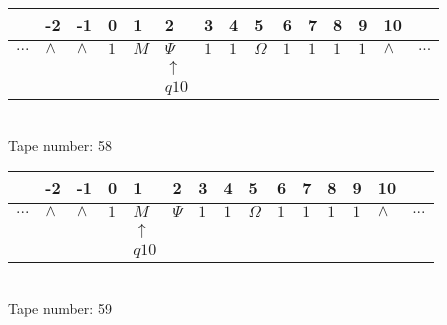 \documentclass{article}
\begin{document}
\begin{table}[H]
\centering
\begin{tabular}{lllllllllllllll}
 & -2 & -1 & 0 & 1 & 2 & 3 & 4 & 5 & 6 & 7 & 8 & 9 & 10 & \\
\hline
$...$ & \multicolumn{1}{|l|}{$\wedge$} & \multicolumn{1}{|l|}{$\wedge$} & \multicolumn{1}{|l|}{$1$} & \multicolumn{1}{|l|}{$M$} & \multicolumn{1}{|l|}{$\Psi$} & \multicolumn{1}{|l|}{$1$} & \multicolumn{1}{|l|}{$1$} & \multicolumn{1}{|l|}{$\Omega$} & \multicolumn{1}{|l|}{$1$} & \multicolumn{1}{|l|}{$1$} & \multicolumn{1}{|l|}{$1$} & \multicolumn{1}{|l|}{$1$} & \multicolumn{1}{|l|}{$\wedge$} & $...$\\
\hline
&  &  &  &  & $\uparrow$ &  &  &  &  &  &  &  &  &  \\
&  &  &  &  & $ q10 $ &  &  &  &  &  &  &  &  &  \\
\end{tabular}
\\
Tape number: 58
\noindent\makebox[\linewidth]{\hdashrule{\textwidth}{1pt}{1pt}}\end{table}

\begin{table}[H]
\centering
\begin{tabular}{lllllllllllllll}
 & -2 & -1 & 0 & 1 & 2 & 3 & 4 & 5 & 6 & 7 & 8 & 9 & 10 & \\
\hline
$...$ & \multicolumn{1}{|l|}{$\wedge$} & \multicolumn{1}{|l|}{$\wedge$} & \multicolumn{1}{|l|}{$1$} & \multicolumn{1}{|l|}{$M$} & \multicolumn{1}{|l|}{$\Psi$} & \multicolumn{1}{|l|}{$1$} & \multicolumn{1}{|l|}{$1$} & \multicolumn{1}{|l|}{$\Omega$} & \multicolumn{1}{|l|}{$1$} & \multicolumn{1}{|l|}{$1$} & \multicolumn{1}{|l|}{$1$} & \multicolumn{1}{|l|}{$1$} & \multicolumn{1}{|l|}{$\wedge$} & $...$\\
\hline
&  &  &  & $\uparrow$ &  &  &  &  &  &  &  &  &  &  \\
&  &  &  & $ q10 $ &  &  &  &  &  &  &  &  &  &  \\
\end{tabular}
\\
Tape number: 59
\noindent\makebox[\linewidth]{\hdashrule{\textwidth}{1pt}{1pt}}\end{table}
\end{document}
